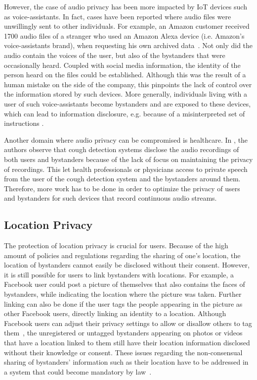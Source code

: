 \documentclass[conference]{IEEEtran}
\begin{document}
However, the case of audio privacy has been more impacted by \ac{IoT} devices such as voice-assistants. In fact, cases have been reported where audio files were unwillingly sent to other individuals. For example, an Amazon customer received 1700 audio files of a stranger who used an Amazon Alexa device (i.e. Amazon's voice-assistants brand), when requesting his own archived data~\cite{huffpost2018amazon}. Not only did the audio contain the voices of the user, but also of the bystanders that were occasionally heard. Coupled with social media information, the identity of the person heard on the files could be established. Although this was the result of a human mistake on the side of the company, this pinpoints the lack of control over the information stored by such devices. More generally, individuals living with a user of such voice-assistants become bystanders and are exposed to these devices, which can lead to information disclosure, e.g. because of a misinterpreted set of instructions 
\cite{huffpost2018amazon}. 

Another domain where audio privacy can be compromised is healthcare. In \cite{larson2011accurate}, the authors observe that cough detection systems disclose the audio recordings of both users and bystanders because of the lack of focus on maintaining the privacy of recordings. This let health professionals or physicians access to private speech from the user of the cough detection system and the bystanders around them. Therefore, more work has to be done in order to optimize the privacy of users and bystanders for such devices that record continuous audio streams.

\subsection{Location Privacy}\label{Location}
The protection of location privacy is crucial for users. Because of the high amount of policies and regulations regarding the sharing of one's location, the location of bystanders cannot easily be disclosed without their consent. However, it is still possible for users to link bystanders with locations. For example, a Facebook user could post a picture of themselves that also contains the faces of bystanders, while indicating the location where the picture was taken. Further linking can also be done if the user tags the people appearing in the picture as other Facebook users, directly linking an identity to a location. Although Facebook users can adjust their privacy settings to allow or disallow others to tag them~\cite{facebook2020help}, the unregistered or untagged bystanders appearing on photos or videos that have a location linked to them still have their location information disclosed without their knowledge or consent. These issues regarding the non-consensual sharing of bystanders' information such as their location have to be addressed in a system that could become mandatory by law~\cite{olteanu2018consensual}.
\end{document}
